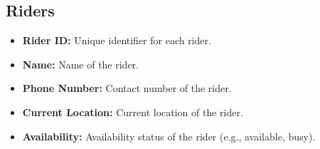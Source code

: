 \documentclass{article}
\begin{document}
\subsection{Riders}
\begin{itemize}
    \item \textbf{Rider ID:} Unique identifier for each rider.
    \item \textbf{Name:} Name of the rider.
    \item \textbf{Phone Number:} Contact number of the rider.
    \item \textbf{Current Location:} Current location of the rider.
    \item \textbf{Availability:} Availability status of the rider (e.g., available, busy).
\end{itemize}
\end{document}
